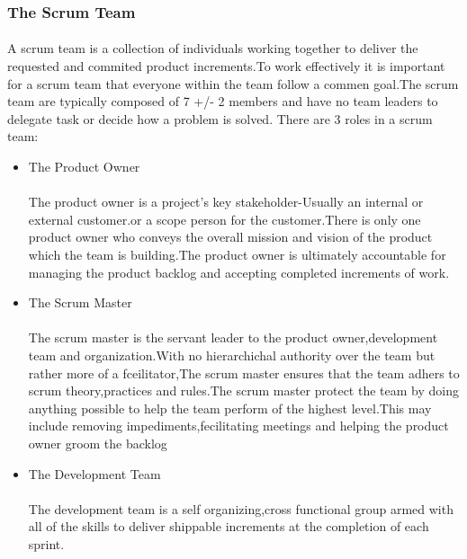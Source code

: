\documentclass[a4paper, 12pt]{report}
\begin{document}
\subsubsection{ The Scrum Team}

\paragraph{}A scrum team is a collection of individuals working together to deliver the requested and commited product increments.To work effectively it is important for a scrum team that everyone within the team follow a commen goal.The scrum team are typically composed of 7 +/- 2 members and have no team leaders to delegate task or decide how a problem is solved.
There are 3 roles in a scrum team:
\begin{itemize} \item The Product Owner

\paragraph{}The product owner is a project's key stakeholder-Usually an internal or external customer.or a scope person for the customer.There is only one product owner who conveys the overall mission and vision of the product which the team is building.The product owner is ultimately accountable for managing the product backlog and accepting completed increments of work.
\item The Scrum Master

\paragraph{}The scrum master is the servant leader to the product owner,development team and organization.With no hierarchichal authority over the team but rather more of a fceilitator,The scrum master ensures that the team adhers to scrum theory,practices and rules.The scrum master protect the
team by doing anything possible to help the team perform of the highest level.This may include removing impediments,fecilitating meetings and helping the product owner groom the backlog

\item The Development Team

\paragraph{}The development team is a self organizing,cross functional group armed with all of the skills to deliver shippable increments at the completion of each sprint.
\end{itemize}
\end{document}
